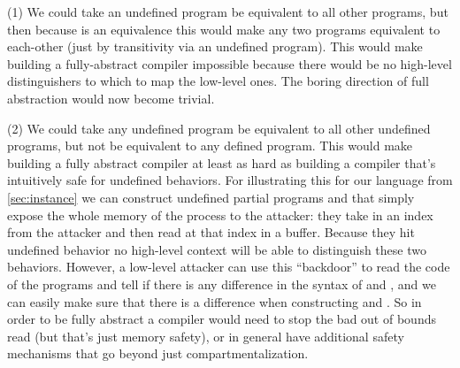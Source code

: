 \documentclass[10pt, conference, compsocconf, letterpaper, times]{IEEEtran}
\begin{document}

(1) We could take an undefined program be equivalent to all other
programs, but then because  is an equivalence this would make
any two programs equivalent to each-other (just by transitivity
via an undefined program). This would make building a fully-abstract
compiler impossible because there would be no high-level distinguishers
to which to map the low-level ones. The boring direction of full
abstraction would now become trivial.

(2) We could take any undefined program be equivalent to all other
undefined programs, but not be equivalent to any defined program.
This would make building a fully abstract compiler at least as hard as building
a compiler that's intuitively safe for undefined behaviors. For
illustrating this for our language from \autoref{sec:instance} we can
construct undefined partial programs  and  that simply expose
the whole memory of the process to the attacker: they take in an index
from the attacker and then read at that index in a buffer. Because
they hit undefined behavior no high-level context will be able to
distinguish these two behaviors. However, a low-level attacker can use
this ``backdoor'' to read the code of the programs and tell if there
is any difference in the syntax of  and , and we
can easily make sure that there is a difference when constructing 
and . So in order to be fully abstract a compiler would need to
stop the bad out of bounds read (but that's just memory safety), or in
general have additional safety mechanisms that go beyond just
compartmentalization.
\end{document}
